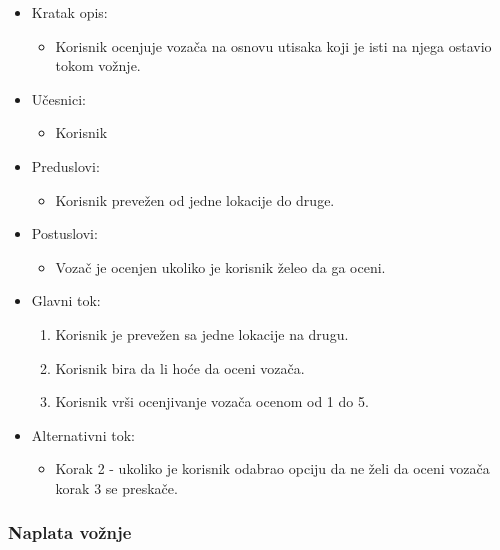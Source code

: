 \begin{itemize}
	\item Kratak opis:
		\begin{itemize}
			\item Korisnik ocenjuje vozača na osnovu utisaka koji je isti na njega ostavio tokom vožnje.
		\end{itemize}
	\item Učesnici:
		\begin{itemize}
			\item Korisnik
		\end{itemize}				
	\item Preduslovi:
		\begin{itemize}
		    \item Korisnik prevežen od jedne lokacije do druge.
		\end{itemize}
	\item Postuslovi:
		\begin{itemize}
			\item Vozač je ocenjen ukoliko je korisnik želeo da ga oceni.
		\end{itemize}		
	\item Glavni tok:
		\begin{enumerate}
		    \item Korisnik je prevežen sa jedne lokacije na drugu.
		    \item Korisnik bira da li hoće da oceni vozača.
		    \item Korisnik vrši ocenjivanje vozača ocenom od 1 do 5. 
		\end{enumerate}
	\item Alternativni tok:
		\begin{itemize}
    		\item Korak 2 - ukoliko je korisnik odabrao opciju da ne želi da oceni vozača korak 3 se preskače.
		\end{itemize}
\end{itemize}


\subsubsection{\bfseries Naplata vožnje}

